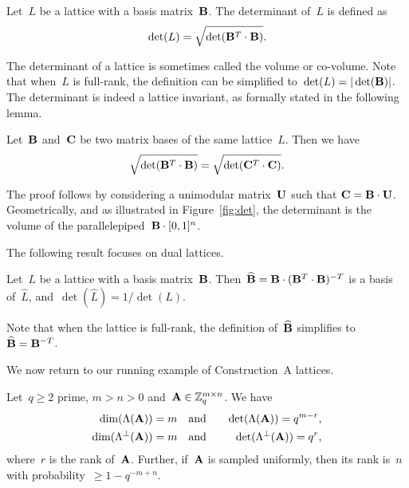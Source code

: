 \begin{definition}
\label{def:vol}
Let~$L$ be a lattice with a basis matrix~${\bf B}$. The determinant of~$L$ is defined as
\[
\det(L) = \sqrt{\det( {\bf B}^T \cdot {\bf B})}.
\]
\end{definition}

The determinant of a lattice is sometimes called the volume or co-volume. Note that when~$L$ is full-rank, the definition can 
be simplified to~$\det(L) = |\det ({\bf B})|$. The determinant is indeed a lattice invariant, as formally stated in the 
following lemma. 

\begin{lemma}
Let~${\bf B}$ and~${\bf C}$ be two matrix bases of the same lattice~$L$. Then we have
 \[
 \sqrt{\det( {\bf B}^T \cdot {\bf B})} =  \sqrt{\det( {\bf C}^T \cdot {\bf C})}.
\]
\end{lemma}

The proof follows by considering a unimodular matrix~${\bf U}$ such that ${\bf C} = {\bf B} \cdot {\bf U}$. 
Geometrically, and as illustrated in Figure~\ref{fig:det}, the determinant is the volume of the parallelepiped~${\bf B} \cdot [0,1]^n$. 

The following result focuses on dual lattices. 

\begin{lemma}
\label{le:dual_det}
Let~$L$ be a lattice with a basis matrix~${\bf B}$. Then~$\widehat{{\bf B}} = {\bf B} \cdot ( {\bf B}^T \cdot {\bf B})^{-T}$ 
is a basis of~$\widehat{L}$, and~$\det(\widehat{L}) = 1/\det(L)$.  
\end{lemma}
 
Note that when the lattice is full-rank, the definition of~$\widehat{{\bf B}}$ simplifies to~$\widehat{{\bf B}} =  {\bf B}^{-T}$. 

We now return to our running example of Construction~A lattices. 

\begin{lemma}
\label{le:consA_dimdet}
Let~$q\geq 2$ prime, $m>n>0$ and~${\bf A} \in \mathbb{Z}_q^{m \times n}$. 
We have 
\begin{eqnarray*}
\dim (\Lambda({\bf A})) = m \ \ &\mbox{ and }& \ \ \det(\Lambda({\bf A})) = q^{m - r}, \\
\dim (\Lambda^{\perp}({\bf A})) = m \ \ &\mbox{ and }& \ \ \det(\Lambda^{\perp}({\bf A})) = q^{r},
\end{eqnarray*}
where~$r$ is the rank of~${\bf A}$. Further, if~${\bf A}$ is sampled uniformly, then its 
rank is~$n$ with probability~$\geq 1 - q^{-m+n}$. 
\end{lemma}

